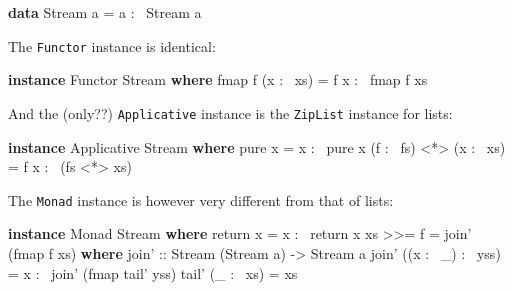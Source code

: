 \documentclass[]{article}
\newenvironment{Shaded}{}{}
\newcommand{\DataTypeTok}[1]{\textcolor[rgb]{0.56,0.13,0.00}{#1}}
\newcommand{\FunctionTok}[1]{\textcolor[rgb]{0.02,0.16,0.49}{#1}}
\newcommand{\KeywordTok}[1]{\textcolor[rgb]{0.00,0.44,0.13}{\textbf{#1}}}
\newcommand{\NormalTok}[1]{#1}
\newcommand{\OtherTok}[1]{\textcolor[rgb]{0.00,0.44,0.13}{#1}}
\begin{document}
\begin{Shaded}
\begin{Highlighting}[]
\KeywordTok{data} \DataTypeTok{Stream}\NormalTok{ a }\FunctionTok{=}\NormalTok{ a }\FunctionTok{:~} \DataTypeTok{Stream}\NormalTok{ a}
\end{Highlighting}
\end{Shaded}

The \texttt{Functor} instance is identical:

\begin{Shaded}
\begin{Highlighting}[]
\KeywordTok{instance} \DataTypeTok{Functor} \DataTypeTok{Stream} \KeywordTok{where}
\NormalTok{    fmap f (x }\FunctionTok{:~}\NormalTok{ xs) }\FunctionTok{=}\NormalTok{ f x }\FunctionTok{:~}\NormalTok{ fmap f xs}
\end{Highlighting}
\end{Shaded}

And the (only??) \texttt{Applicative} instance is the \texttt{ZipList} instance
for lists:

\begin{Shaded}
\begin{Highlighting}[]
\KeywordTok{instance} \DataTypeTok{Applicative} \DataTypeTok{Stream} \KeywordTok{where}
\NormalTok{    pure x }\FunctionTok{=}\NormalTok{ x }\FunctionTok{:~}\NormalTok{ pure x}
\NormalTok{    (f }\FunctionTok{:~}\NormalTok{ fs) }\FunctionTok{<*>}\NormalTok{ (x }\FunctionTok{:~}\NormalTok{ xs) }\FunctionTok{=}\NormalTok{ f x }\FunctionTok{:~}\NormalTok{ (fs }\FunctionTok{<*>}\NormalTok{ xs)}
\end{Highlighting}
\end{Shaded}

The \texttt{Monad} instance is however very different from that of lists:

\begin{Shaded}
\begin{Highlighting}[]
\KeywordTok{instance} \DataTypeTok{Monad} \DataTypeTok{Stream} \KeywordTok{where}
\NormalTok{    return x }\FunctionTok{=}\NormalTok{ x }\FunctionTok{:~}\NormalTok{ return x}
\NormalTok{    xs }\FunctionTok{>>=}\NormalTok{ f }\FunctionTok{=}\NormalTok{ join' (fmap f xs)}
      \KeywordTok{where}
\OtherTok{        join' ::} \DataTypeTok{Stream}\NormalTok{ (}\DataTypeTok{Stream}\NormalTok{ a) }\OtherTok{->} \DataTypeTok{Stream}\NormalTok{ a}
\NormalTok{        join' ((x }\FunctionTok{:~}\NormalTok{ _) }\FunctionTok{:~}\NormalTok{ yss) }\FunctionTok{=}\NormalTok{ x }\FunctionTok{:~}\NormalTok{ join' (fmap tail' yss)}
\NormalTok{        tail' (_ }\FunctionTok{:~}\NormalTok{ xs) }\FunctionTok{=}\NormalTok{ xs}
\end{Highlighting}
\end{Shaded}
\end{document}
